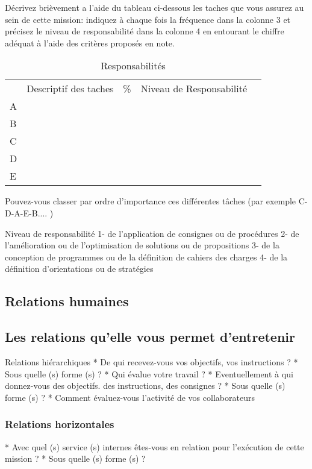 \documentclass{resume} %
\begin{document}
Décrivez brièvement a l'aide du tableau ci-dessous les taches que vous assurez au sein de cette mission: indiquez à chaque fois la fréquence dans la colonne 3 et précisez le niveau de responsabilité dans la colonne 4 en entourant le chiffre adéquat à l'aide des critères proposés en note.
\begin{table}[!htbp]
\label{my-label}
\begin{tabular}{|l|l|l|l|l}
\cline{1-4}
   & Descriptif des taches &  \% & Niveau de
Responsabilité  &  \\ \cline{1-4}
 A&  &  &  &  \\ \cline{1-4}
 B&  &  &  &  \\ \cline{1-4}
 C&  &  &  &  \\ \cline{1-4}
 D&  &  &  &  \\ \cline{1-4}
 E&  &  &  &  \\ \cline{1-4}
\end{tabular}
\caption{Responsabilités}
\end{table}

Pouvez-vous classer par ordre d'importance ces différentes tâches (par exemple C-D-A-E-B.... )

Niveau de responsabilité
1- de l'application de consignes ou de procédures
2- de l'amélioration ou de l'optimisation de solutions ou de propositions
3- de la conception de programmes ou de la définition de cahiers des charges 
4- de la définition d'orientations ou de stratégies

	\subsection{Relations humaines}
	
		\subsection{Les relations qu'elle vous permet d'entretenir}
Relations hiérarchiques
* De qui recevez-vous vos objectifs, vos instructions ?
* Sous quelle (s) forme (s) ?
* Qui évalue votre travail ?
* Eventuellement à qui donnez-vous des objectifs. des instructions, des consignes ?
* Sous quelle (s) forme (s) ?
* Comment évaluez-vous l'activité de vos collaborateurs
		\subsubsection{Relations horizontales}
* Avec quel (s) service (s) internes êtes-vous en relation pour l'exécution de cette mission ?
* Sous quelle (s) forme (s) ?
\end{document}
